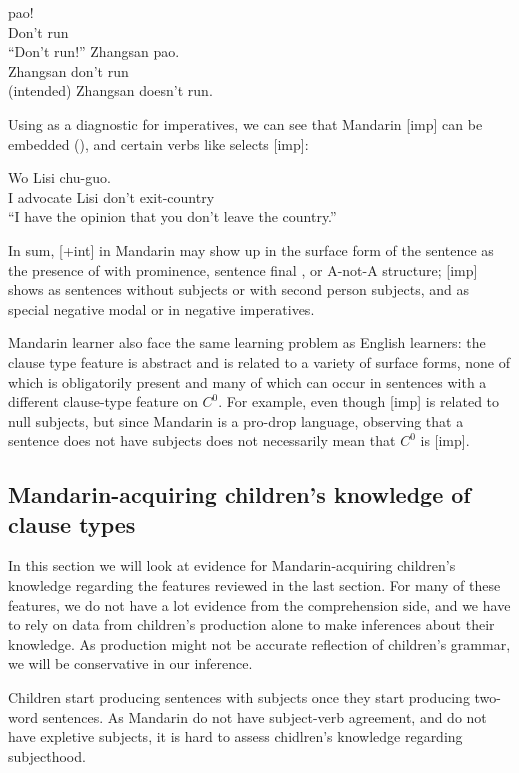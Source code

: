\gll {} pao!\\
Don't run\\
``Don't run!''
\ex 
\gll *Zhangsan  pao.\\
Zhangsan don't run\\
(intended) Zhangsan doesn't run.
\exl
\eex 

Using  as a diagnostic for imperatives, we can see that Mandarin [imp] can be embedded (\cite{lithompson, chen2005imp}), and certain verbs like  selects [imp]:

\gll Wo  Lisi  chu-guo.\\
I advocate Lisi don't exit-country\\
\trans ``I have the opinion that you don't leave the country.'' \hfill \textcite[p.458]{lithompson}
\eex

In sum, [+int] in Mandarin may show up in the surface form of the sentence as the presence of \twh{} with prominence, sentence final , or A-not-A structure; [imp] shows as sentences without subjects or with second person subjects, and as special negative modal  or  in negative imperatives. 

Mandarin learner also face the same learning problem as English learners: the clause type feature is abstract and is related to a variety of surface forms, none of which is obligatorily present and many of which can occur in sentences with a different clause-type feature on $C^{0}$. For example, even though [imp] is related to null subjects, but since Mandarin is a pro-drop language, observing that a sentence does not have subjects does not necessarily mean that $C^{0}$ is [imp].  


\subsection{Mandarin-acquiring children's knowledge of clause types}
\label{sec:mancl:bg:child}
In this section we will look at evidence for Mandarin-acquiring children's knowledge regarding the features reviewed in the last section. For many of these features, we do not have a lot evidence from the comprehension side, and we have to rely on data from children's production alone to make inferences about their knowledge. As production might not be accurate reflection of children's grammar, we will be conservative in our inference.   

  Children start producing sentences with subjects once they start producing two-word sentences. As Mandarin do not have subject-verb agreement, and do not have expletive subjects, it is hard to assess chidlren's knowledge regarding subjecthood. %

